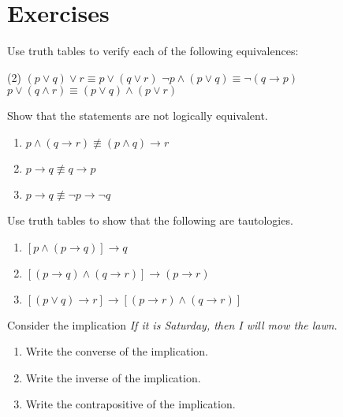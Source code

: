 \clearpage

\section{Exercises}

\begin{exer}
 Use truth tables to verify each of the following equivalences:
\begin{tasks}(2)
	\task $(p\lor q)\lor r \equiv p\lor (q\lor r)$
	\task $\lnot p\land(p\lor q)\equiv \lnot(q \to p)$
	\task $p\lor (q\land r)\equiv (p\lor q)\land (p\lor r)$
	\task 
	\end{tasks}
\end{exer}

\begin{exer}
Show that the statements are not logically equivalent. 
\begin{enumerate}[label= \alph*)]
\item $p\land (q\to r)\not\equiv (p \land q)\to r$

\item $p\to q\not\equiv q\to p$

\item $p\to q\not\equiv \lnot p\to \lnot q$
\end{enumerate}
\end{exer}

\begin{exer}
Use truth tables to show that the following are tautologies.
\begin{enumerate}[label= \alph*)]
\item $[p\land (p\to q)]\to q$

\item $[(p\to q)\land (q\to r)]\to (p\to r)$

\item $[(p\lor q)\to r]\to [(p\to r) \land (q\to r)]$
\end{enumerate}
\end{exer}

\begin{exer} Consider the implication {\itshape If it is Saturday, then I will mow the lawn}.
\label{exer:conincon} 
\begin{enumerate}[label= \alph*)]
\item Write the converse of the implication.
\item Write the inverse of the implication.
\item Write the contrapositive of the implication.
\end{enumerate}
\end{exer}

